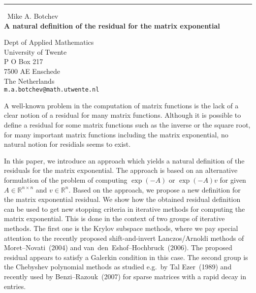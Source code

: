 \documentclass{report}
\begin{document}
\begin{center}
\rule{6in}{1pt} \
{\large Mike A. Botchev \\
{\bf A natural definition of the residual for the matrix exponential}}

Dept of Applied Mathematics \\ University of Twente \\ P O Box 217 \\ 7500 AE Enschede \\ The Netherlands
\\
{\tt m.a.botchev@math.utwente.nl}\end{center}

A well-known problem in the computation of matrix functions is the lack
of a clear notion of a residual for many matrix functions. Although
it is possible to define a residual for some matrix functions such as
the inverse or the square root, for many important matrix functions including
the matrix exponential, no natural notion for residials seems to exist.

In this paper, we introduce an approach which yields a natural definition
of the residuals for the matrix exponential. The approach is based on an
alternative formulation of the problem of computing $\exp(-A)$ or $\exp(-A)v$
for given $A\in\mathbb{R}^{n\times n}$ and $v\in\mathbb{R}^n$.
Based on the approach, we propose a new definition for the matrix exponential
residual. We show how the obtained residual definition can be used to get
new stopping criteria in iterative methods for computing the matrix
exponential. This is done in the context of two groups of iterative methods.
The first one is the Krylov
subspace methods, where we pay special attention to the recently proposed
shift-and-invert Lanczos/Arnoldi methods of Moret--Novati~(2004) and
van~den~Eshof--Hochbruck~(2006). The proposed residual appears to satisfy
a Galerkin condition in this case. The second group is the Chebyshev
polynomial methods as studied e.g.\ by Tal Ezer~(1989) and recently used by
Benzi--Razouk~(2007) for sparse matrices with a rapid decay in entries.
\end{document}
